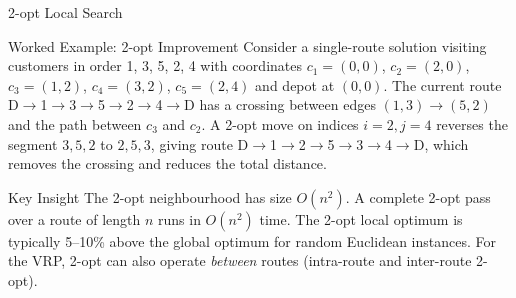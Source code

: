 \documentclass[aspectratio=169,10pt]{beamer}
\begin{document}
\begin{frame}[allowframebreaks]{2-opt Local Search}
  \framebreak

  \begin{exampleblock}{Worked Example: 2-opt Improvement}
    Consider a single-route solution visiting customers in order
    1, 3, 5, 2, 4 with coordinates $c_1=(0,0)$, $c_2=(2,0)$,
    $c_3=(1,2)$, $c_4=(3,2)$, $c_5=(2,4)$ and depot at $(0,0)$.
    The current route D$\to$1$\to$3$\to$5$\to$2$\to$4$\to$D has a
    crossing between edges $(1,3)\to(5,2)$ and the path between $c_3$
    and $c_2$.  A 2-opt move on indices $i=2, j=4$ reverses the segment
    $3,5,2$ to $2,5,3$, giving route D$\to$1$\to$2$\to$5$\to$3$\to$4$\to$D,
    which removes the crossing and reduces the total distance.
  \end{exampleblock}

  \begin{alertblock}{Key Insight}
    The 2-opt neighbourhood has size $O(n^2)$.  A complete 2-opt pass
    over a route of length $n$ runs in $O(n^2)$ time.  The 2-opt local
    optimum is typically 5--10\% above the global optimum for random
    Euclidean instances.  For the VRP, 2-opt can also operate
    \emph{between} routes (intra-route and inter-route 2-opt).
  \end{alertblock}

\end{frame}
\end{document}
